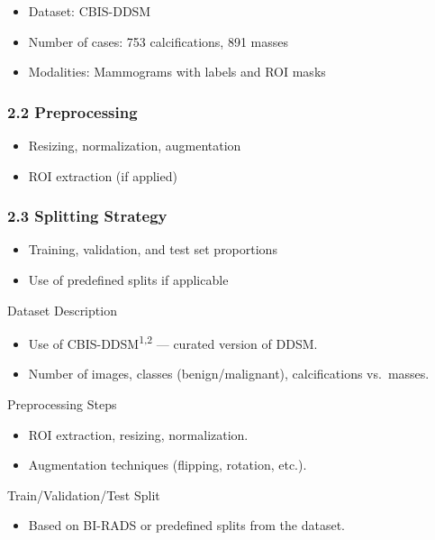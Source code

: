 \documentclass[
  12pt,
  letterpaper,
  DIV=11,
  numbers=noendperiod]{scrartcl}
\providecommand{\tightlist}{%
  \setlength{\itemsep}{0pt}\setlength{\parskip}{0pt}}
\begin{document}
\begin{itemize}
\tightlist
\item
  Dataset: CBIS-DDSM
\item
  Number of cases: 753 calcifications, 891 masses
\item
  Modalities: Mammograms with labels and ROI masks
\end{itemize}

\subsubsection{2.2 Preprocessing}\label{preprocessing}

\begin{itemize}
\tightlist
\item
  Resizing, normalization, augmentation
\item
  ROI extraction (if applied)
\end{itemize}

\subsubsection{2.3 Splitting Strategy}\label{splitting-strategy}

\begin{itemize}
\tightlist
\item
  Training, validation, and test set proportions
\item
  Use of predefined splits if applicable
\end{itemize}

Dataset Description

\begin{itemize}
\tightlist
\item
  Use of CBIS-DDSM\textsuperscript{1,2} --- curated version of DDSM.
\item
  Number of images, classes (benign/malignant), calcifications
  vs.~masses.
\end{itemize}

Preprocessing Steps

\begin{itemize}
\tightlist
\item
  ROI extraction, resizing, normalization.
\item
  Augmentation techniques (flipping, rotation, etc.).
\end{itemize}

Train/Validation/Test Split

\begin{itemize}
\tightlist
\item
  Based on BI-RADS or predefined splits from the dataset.
\end{itemize}
\end{document}
